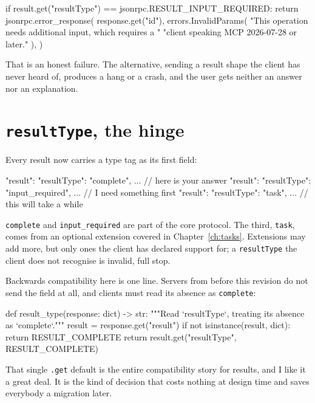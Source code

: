\begin{py}
if result.get("resultType") == jsonrpc.RESULT_INPUT_REQUIRED:
    return jsonrpc.error_response(
        response.get("id"),
        errors.InvalidParams(
            "This operation needs additional input, which requires a "
            "client speaking MCP 2026-07-28 or later."
        ),
    )
\end{py}

That is an honest failure. The alternative, sending a result shape the client has
never heard of, produces a hang or a crash, and the user gets neither an answer
nor an explanation.


\section{\texttt{resultType}, the hinge}

Every result now carries a type tag as its first field:

\begin{wire}
"result": { "resultType": "complete", ... }        // here is your answer
"result": { "resultType": "input_required", ... }  // I need something first
"result": { "resultType": "task", ... }            // this will take a while
\end{wire}

\texttt{complete} and \texttt{input\_required} are part of the core protocol. The
third, \texttt{task}, comes from an optional extension covered in
Chapter~\ref{ch:tasks}. Extensions may add more, but only ones the client has
declared support for; a \texttt{resultType} the client does not recognise is
invalid, full stop.

Backwards compatibility here is one line. Servers from before this revision do
not send the field at all, and clients must read its absence as
\texttt{complete}:

\begin{py}
def result_type(response: dict) -> str:
    """Read `resultType`, treating its absence as `complete`."""
    result = response.get("result")
    if not isinstance(result, dict):
        return RESULT_COMPLETE
    return result.get("resultType", RESULT_COMPLETE)
\end{py}

That single \texttt{.get} default is the entire compatibility story for results,
and I like it a great deal. It is the kind of decision that costs nothing at
design time and saves everybody a migration later.

